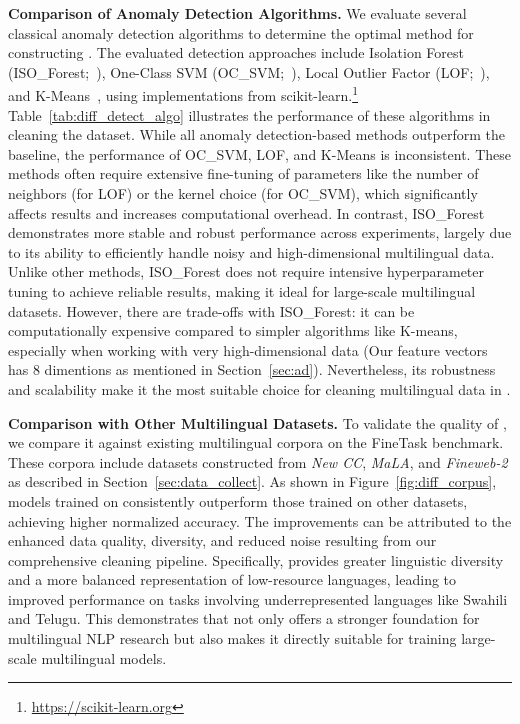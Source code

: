 

\noindent\textbf{Comparison of Anomaly Detection Algorithms.}
We evaluate several classical anomaly detection algorithms to determine the optimal method for constructing \dcad.
The evaluated detection approaches include Isolation Forest (ISO\_Forest;~\citealp{liu2008isolation}), One-Class SVM (OC\_SVM;~\citealp{manevitz2001one}), Local Outlier Factor (LOF;~\citealp{breunig2000lof}), and K-Means~\cite{hartigan1979k}, using implementations from scikit-learn.\footnote{\url{https://scikit-learn.org}}
Table~\ref{tab:diff_detect_algo} illustrates the performance of these algorithms in cleaning the dataset.
While all anomaly detection-based methods outperform the baseline, the performance of OC\_SVM, LOF, and K-Means is inconsistent.
These methods often require extensive fine-tuning of parameters like the number of neighbors (for LOF) or the kernel choice (for OC\_SVM), which significantly affects results and increases computational overhead.
In contrast, ISO\_Forest demonstrates more stable and robust performance across experiments, largely due to its ability to efficiently handle noisy and high-dimensional multilingual data.
Unlike other methods, ISO\_Forest does not require intensive hyperparameter tuning to achieve reliable results, making it ideal for large-scale multilingual datasets.
However, there are trade-offs with ISO\_Forest: it can be computationally expensive compared to simpler algorithms like K-means, especially when working with very high-dimensional data (Our feature vectors has 8 dimentions as mentioned in Section~\ref{sec:ad}).
Nevertheless, its robustness and scalability make it the most suitable choice for cleaning multilingual data in \dcad.



\noindent\textbf{Comparison with Other Multilingual Datasets.}
To validate the quality of \dcad, we compare it against existing multilingual corpora on the FineTask benchmark.
These corpora include datasets constructed from \textit{New CC}, \textit{MaLA}, and \textit{Fineweb-2} as described in Section~\ref{sec:data_collect}.
As shown in Figure~\ref{fig:diff_corpus}, models trained on \dcad consistently outperform those trained on other datasets, achieving higher normalized accuracy.
The improvements can be attributed to the enhanced data quality, diversity, and reduced noise resulting from our comprehensive cleaning pipeline.
Specifically, \dcad provides greater linguistic diversity and a more balanced representation of low-resource languages, leading to improved performance on tasks involving underrepresented languages like Swahili and Telugu.
This demonstrates that \dcad not only offers a stronger foundation for multilingual NLP research but also makes it directly suitable for training large-scale multilingual models.